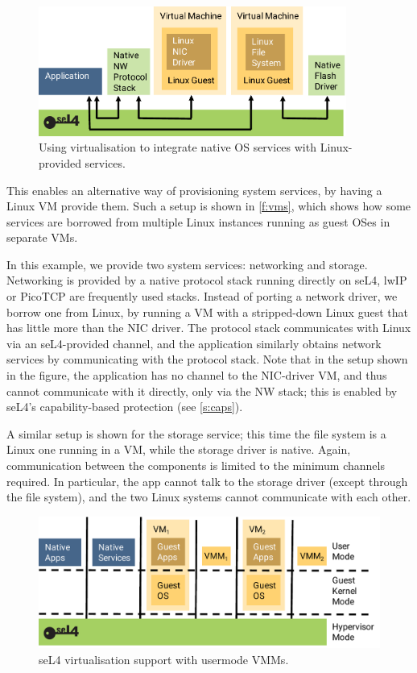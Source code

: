 \documentclass[english,a4paper,12pt\ifDraft,draft\fi]{report}
\begin{document}
  \begin{figure}[ht]
    \centering
    \includegraphics[width=0.9\textwidth]{hypervisor}
    \caption[VM-provided services]{Using virtualisation to integrate
      native OS services with Linux-provided services.}
    \label{f:vms}
  \end{figure}

  This enables an alternative way of provisioning system services, by
  having a Linux VM provide them. Such a setup is shown in
  \autoref{f:vms}, which shows how some services are borrowed from
  multiple Linux instances running as guest OSes in separate VMs.

  In this example, we provide two system services: networking and
  storage. Networking is provided by a native protocol stack
  running directly on seL4, lwIP or PicoTCP are frequently used
  stacks. Instead of porting a network driver, we borrow one from
  Linux, by running a VM with a stripped-down Linux guest that has
  little more than the NIC driver. The protocol stack communicates
  with Linux via an seL4-provided channel, and the application
  similarly obtains network services by communicating with the
  protocol stack. Note that in the setup shown in the figure, the
  application has no channel to the NIC-driver VM, and thus cannot
  communicate with it directly, only via the NW stack; this is enabled
  by seL4's capability-based protection (see \autoref{s:caps}).

  A similar setup is shown for the storage service; this time the
  file system is a Linux one running in a VM, while the storage
  driver is native. Again, communication between the components is
  limited to the minimum channels required. In particular, the app
  cannot talk to the storage driver (except through the file system),
  and the two Linux systems cannot communicate with each other.

  \begin{figure}[tb]
    \centering
    \includegraphics{vmm}
    \caption{seL4 virtualisation support with usermode VMMs.}
    \label{f:vmm}
  \end{figure}
\end{document}
